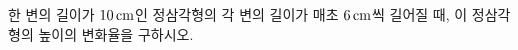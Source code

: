 한 변의 길이가 $10\mkern3mu \mathrm{cm}$인 정삼각형의 각 변의 길이가 매초 $6\mkern3mu \mathrm{cm}$씩 길어질 때, 이 정삼각형의 높이의 변화율을 구하시오.
